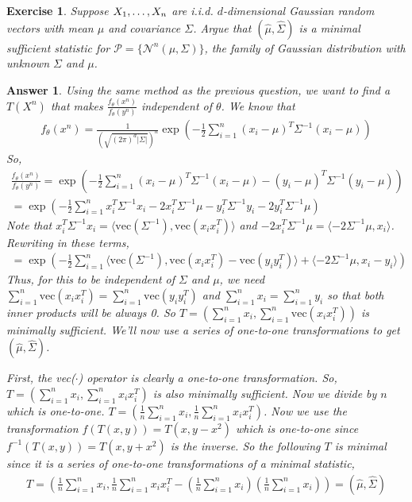 \documentclass[12pt]{article}
\theoremstyle{colon}
\newtheorem{exercise}{Exercise}
\newtheorem*{answer}{Answer}
\begin{document}
\clearpage

\begin{exercise}
  Suppose $X_1, \mathellipsis, X_n$ are i.i.d. $d$-dimensional Gaussian random vectors with mean $\mu$ and covariance $\Sigma$. Argue that $(\hat{\mu}, \hat{\Sigma})$ is a minimal sufficient statistic for $\mathcal{P} = \{ \mathcal{N}^n (\mu, \Sigma) \}$, the family of Gaussian distribution with unknown $\Sigma$ and $\mu$.
\end{exercise}

\begin{answer}
  Using the same method as the previous question, we want to find a $T(X^n)$ that makes $\frac{f_\theta(x^n)}{f_\theta(y^n)}$ independent of $\theta$. We know that
  \begin{gather*}
    f_\theta(x^n) = \frac{1}{\left(\sqrt{(2\pi)^d |\Sigma|} \right)^n} \exp \left(-\frac{1}{2} \sum_{i=1}^n (x_i-\mu)^T \Sigma^{-1} (x_i-\mu) \right)
  \end{gather*}
  So,
  \begin{gather*}
    \frac{f_\theta(x^n)}{f_\theta(y^n)} = \exp \left( -\frac{1}{2} \sum_{i=1}^n (x_i-\mu)^T \Sigma^{-1} (x_i-\mu) - (y_i-\mu)^T \Sigma^{-1} (y_i-\mu) \right) \\
    = \exp \left( -\frac{1}{2} \sum_{i=1}^n x_i^T \Sigma^{-1} x_i -2x_i^T \Sigma^{-1} \mu -y_i^T \Sigma^{-1} y_i -2y_i^T \Sigma^{-1} \mu \right)
  \end{gather*}
  Note that $x_i^T \Sigma^{-1} x_i = \langle \text{vec}(\Sigma^{-1}), \text{vec}(x_i x_i^T) \rangle$ and $-2x_i^T \Sigma^{-1} \mu = \langle -2 \Sigma^{-1} \mu, x_i \rangle$. Rewriting in these terms,
  \begin{gather*}
    = \exp \left( -\frac{1}{2} \sum_{i=1}^n \langle \text{vec}(\Sigma^{-1}), \text{vec}(x_i x_i^T) - \text{vec}(y_i y_i^T) \rangle + \langle -2 \Sigma^{-1} \mu, x_i - y_i \rangle \right)
  \end{gather*}
  Thus, for this to be independent of $\Sigma$ and $\mu$, we need $\sum_{i=1}^n \text{vec}(x_i x_i^T) = \sum_{i=1}^n \text{vec}(y_i y_i^T)$ and $\sum_{i=1}^n x_i = \sum_{i=1}^n y_i$ so that both inner products will be always 0.
  So $T = (\sum_{i=1}^n x_i, \sum_{i=1}^n \text{vec}(x_i x_i^T))$ is minimally sufficient. We'll now use a series of one-to-one transformations to get $(\hat{\mu}, \hat{\Sigma})$.

  First, the vec($\cdot$) operator is clearly a one-to-one transformation. So, $T = (\sum_{i=1}^n x_i, \sum_{i=1}^n x_i x_i^T)$ is also minimally sufficient. Now we divide by $n$ which is one-to-one. $T = (\frac{1}{n} \sum_{i=1}^n x_i, \frac{1}{n} \sum_{i=1}^n x_i x_i^T)$. Now we use the transformation $f(T(x,y)) = T(x, y - x^2)$ which is one-to-one since $f^{-1}(T(x,y)) = T(x, y + x^2)$ is the inverse. So the following $T$ is minimal since it is a series of one-to-one transformations of a minimal statistic,
  \begin{gather*}
    T = \left( \frac{1}{n} \sum_{i=1}^n x_i, \frac{1}{n} \sum_{i=1}^n x_i x_i^T - \left( \frac{1}{n} \sum_{i=1}^n x_i \right) \left( \frac{1}{n} \sum_{i=1}^n x_i \right) \right) = \left( \hat{\mu}, \hat{\Sigma} \right)
  \end{gather*}
\end{answer}
\end{document}
